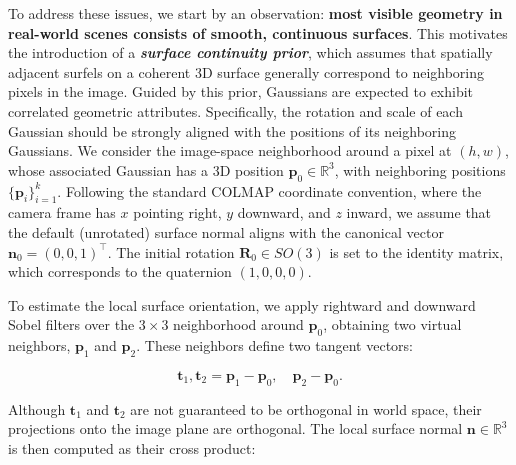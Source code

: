 To address these issues, we start by an observation: \textbf{most visible geometry in real-world scenes consists of smooth, continuous surfaces}.
This motivates the introduction of a \textbf{\textit{surface continuity prior}}, which assumes that spatially adjacent surfels on a coherent 3D surface generally correspond to neighboring pixels in the image. 
Guided by this prior, Gaussians are expected to exhibit correlated geometric attributes. Specifically, the rotation and scale of each Gaussian should be strongly aligned with the positions of its neighboring Gaussians.
We consider the image-space neighborhood around a pixel at \( (h, w) \), whose associated Gaussian has a 3D position \( \mathbf{p}_0 \in \mathbb{R}^3 \), with neighboring positions \( \{ \mathbf{p}_i \}_{i=1}^k \). Following the standard COLMAP coordinate convention, where the camera frame has \( x \) pointing right, \( y \) downward, and \( z \) inward, we assume that the default (unrotated) surface normal aligns with the canonical vector \( \mathbf{n}_0 = (0, 0, 1)^\top \).
The initial rotation \( \mathbf{R}_0 \in SO(3) \) is set to the identity matrix, which corresponds to the quaternion \( (1, 0, 0, 0) \).

To estimate the local surface orientation, we apply rightward and downward Sobel filters over the $3 \times 3$ neighborhood around \( \mathbf{p}_0 \), obtaining two virtual neighbors, \( \mathbf{p}_1 \) and \( \mathbf{p}_2 \). These neighbors define two tangent vectors:

\begin{equation}
\mathbf{t}_1, \mathbf{t}_2 = \mathbf{p}_1-\mathbf{p}_0, \quad \mathbf{p}_2-\mathbf{p}_0.
\end{equation}

Although \( \mathbf{t}_1 \) and \( \mathbf{t}_2 \) are not guaranteed to be orthogonal in world space, 
their projections onto the image plane are orthogonal.
The local surface normal \( \mathbf{n} \in \mathbb{R}^3 \) is then computed as their cross product:

